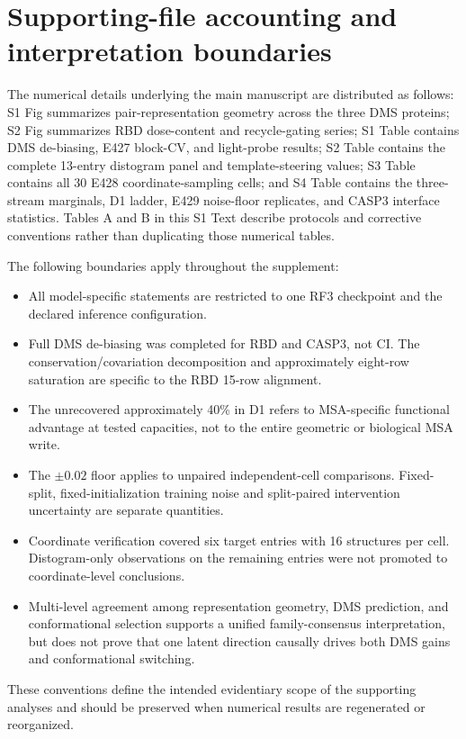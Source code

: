 \documentclass[10pt,a4paper]{article}
\begin{document}
\section{Supporting-file accounting and interpretation boundaries}

The numerical details underlying the main manuscript are distributed as follows: S1 Fig summarizes pair-representation geometry across the three DMS proteins; S2 Fig summarizes RBD dose-content and recycle-gating series; S1 Table contains DMS de-biasing, E427 block-CV, and light-probe results; S2 Table contains the complete 13-entry distogram panel and template-steering values; S3 Table contains all 30 E428 coordinate-sampling cells; and S4 Table contains the three-stream marginals, D1 ladder, E429 noise-floor replicates, and CASP3 interface statistics. Tables A and B in this S1 Text describe protocols and corrective conventions rather than duplicating those numerical tables.

The following boundaries apply throughout the supplement:

\begin{itemize}
    \item All model-specific statements are restricted to one RF3 checkpoint and the declared inference configuration.
    \item Full DMS de-biasing was completed for RBD and CASP3, not CI. The conservation/covariation decomposition and approximately eight-row saturation are specific to the RBD 15-row alignment.
    \item The unrecovered approximately 40\% in D1 refers to MSA-specific functional advantage at tested capacities, not to the entire geometric or biological MSA write.
    \item The $\pm0.02$ floor applies to unpaired independent-cell comparisons. Fixed-split, fixed-initialization training noise and split-paired intervention uncertainty are separate quantities.
    \item Coordinate verification covered six target entries with 16 structures per cell. Distogram-only observations on the remaining entries were not promoted to coordinate-level conclusions.
    \item Multi-level agreement among representation geometry, DMS prediction, and conformational selection supports a unified family-consensus interpretation, but does not prove that one latent direction causally drives both DMS gains and conformational switching.
\end{itemize}

These conventions define the intended evidentiary scope of the supporting analyses and should be preserved when numerical results are regenerated or reorganized.
\end{document}
